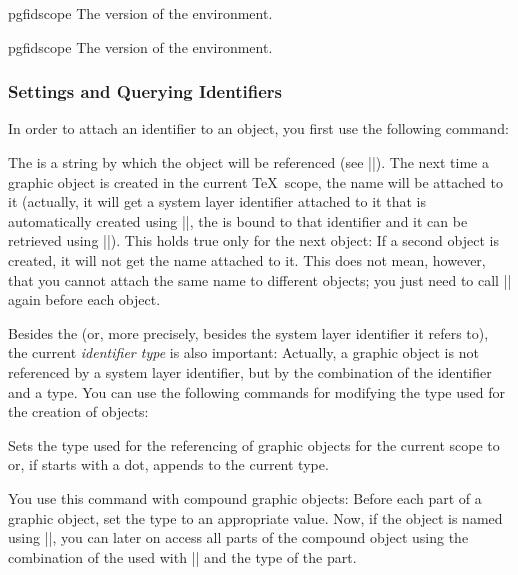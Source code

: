 \begin{plainenvironment}{{pgfidscope}}
    The  version of the environment.
\end{plainenvironment}

\begin{contextenvironment}{{pgfidscope}}
    The  version of the environment.
\end{contextenvironment}


\subsubsection{Settings and Querying Identifiers}

In order to attach an identifier to an object, you first use the following
command:

\begin{command}{\pgfuseid{}}
    The  is a string by which the object will be referenced (see
    |\pgfidrefnextuse|). The next time a graphic object is created in the
    current \TeX\ scope, the name will be attached to it (actually, it will get
    a system layer identifier attached to it that is automatically created
    using |\pgfsys@new@id|, the  is bound to that identifier and it
    can be retrieved using |\pgfidrefnextuse|). This holds true only for the
    next object: If a second object is created, it will not get the name
    attached to it. This does not mean, however, that you cannot attach the
    same name to different objects; you just need to call |\pgfuseid| again
    before each object.

    Besides the  (or, more precisely, besides the system layer
    identifier it refers to), the current \emph{identifier type} is also
    important: Actually, a graphic object is not referenced by a system layer
    identifier, but by the combination of the identifier and a type. You can
    use the following commands for modifying the type used for the creation of
    objects:

    \begin{command}{\pgfusetype{}}
        Sets the type used for the referencing of graphic objects for the
        current scope to  or, if  starts with a dot,
        appends  to the current type.

        You use this command with compound graphic objects: Before each part of
        a graphic object, set the type to an appropriate value. Now, if the
        object is named using |\pgfuseid|, you can later on access all parts of
        the compound object using the combination of the  used with
        |\pgfuseid| and the type of the part.


\end{command}
\end{command}
